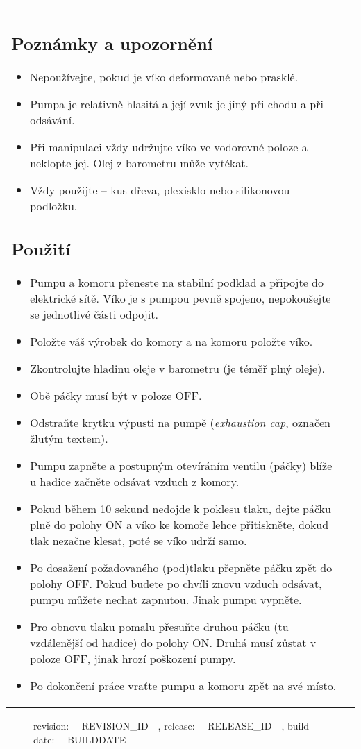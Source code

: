 \documentclass[fleqn]{article}
\begin{document}
\begin{tabular}{@{}
                         p{}%
		         @{\hspace{.04\columnwidth}}%
		         p{}%
		         @{}%
}
\subsection{Poznámky a upozornění}
\begin{itemize}[noitemsep,topsep=0pt]
	\item Nepoužívejte, pokud je víko deformované nebo prasklé.
	\item Pumpa je relativně hlasitá a její zvuk je jiný při chodu \uv{na prázdno} a při odsávání.
	\item Při manipulaci vždy udržujte víko ve vodorovné poloze a neklopte jej. Olej z barometru může vytékat.
	\item Vždy použijte \uv{vlastní dno} -- kus dřeva, plexisklo nebo silikonovou podložku.
\end{itemize}

\subsection{Použití}
\begin{itemize}[noitemsep,topsep=0pt]
	\item Pumpu a komoru přeneste na stabilní podklad a připojte do elektrické sítě. Víko je s pumpou pevně spojeno, nepokoušejte se jednotlivé části odpojit.
	\item Položte váš výrobek do komory a na komoru položte víko.
	\item Zkontrolujte hladinu oleje v barometru (je téměř plný oleje).
	\item Obě páčky musí být v poloze OFF.
	\item Odstraňte krytku výpusti na pumpě (\textit{exhaustion cap}, označen žlutým textem).
	\item Pumpu zapněte a postupným otevíráním ventilu (páčky) blíže u hadice začněte odsávat vzduch z komory.
	\item Pokud během 10 sekund nedojde k poklesu tlaku, dejte páčku plně do polohy ON a víko ke komoře lehce přitiskněte, dokud tlak nezačne klesat, poté se víko udrží samo.
	\item Po dosažení požadovaného (pod)tlaku přepněte páčku zpět do polohy OFF. Pokud budete po chvíli znovu vzduch odsávat, pumpu můžete nechat zapnutou. Jinak pumpu vypněte.
	\item Pro obnovu tlaku pomalu přesuňte druhou páčku (tu vzdálenější od hadice) do polohy ON. Druhá musí zůstat v poloze OFF, jinak hrozí poškození pumpy.
	\item Po dokončení práce vraťte pumpu a komoru zpět na své místo.
\end{itemize}



\end{tabular}

\vfill

\begin{figure}[b]
	\flushright
	\begin{itshape}
    revision: ---REVISION\_ID---, release: ---RELEASE\_ID---, build date: ---BUILDDATE---
	\end{itshape}
\end{figure}
\end{document}
